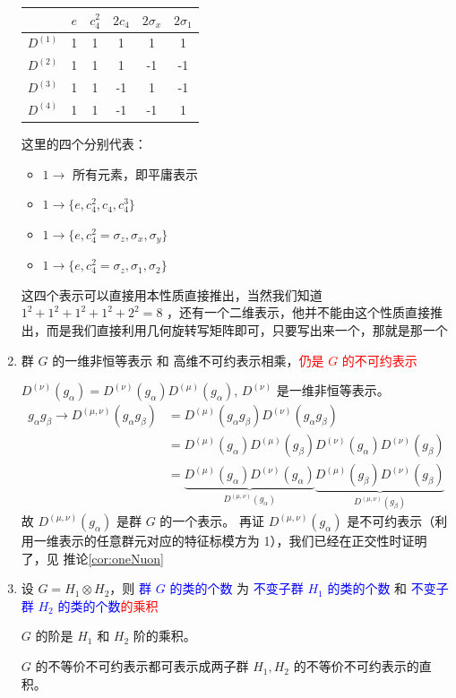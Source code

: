 \begin{enumerate}
    \begin{center}
        \begin{tabular}{c|ccccc}
             & $e$ & $c_4^{2}$ &  $2c_4$ & $2\sigma_{x}$ & $2\sigma_1$\\
            \hline
            $D^{(1)}$ & 1 & 1 & 1 & 1 & 1 \\
            $D^{(2)}$ & 1 & 1 & 1 & -1 & -1 \\
            $D^{(3)}$ & 1 & 1 & -1 & 1 & -1 \\
            $D^{(4)}$ & 1 & 1 & -1 & -1 & 1 \\

        \end{tabular}
        \end{center}
这里的四个分别代表：
\begin{itemize}
  \item ${1}\to $ 所有元素，即平庸表示
  \item ${1}\to \{e, c_4^2,c_4, c_4^3\} $
  \item ${1}\to \{e, c_4^2=\sigma_z, \sigma_x, \sigma_y\} $
  \item ${1}\to \{e, c_4^2=\sigma_z, \sigma_1, \sigma_2\} $
\end{itemize}

这四个表示可以直接用本性质直接推出，当然我们知道 $1^{2}+1^{2}+1^{2}+1^{2}+2^{2}=8$  ，还有一个二维表示，他并不能由这个性质直接推出，而是我们直接利用几何旋转写矩阵即可，只要写出来一个，那就是那一个

\item 群 $G$ 的一维非恒等表示 和 高维不可约表示相乘，\textcolor{red}{仍是 $G$ 的不可约表示}

$D^{(\nu)}(g_\alpha) = D^{(\nu)}(g_\alpha) D^{(\mu)}(g_\alpha)$, $D^{(\nu)}$ 是一维非恒等表示。
\begin{equation}
    \begin{aligned}
        g_\alpha g_\beta \to D^{(\mu,\nu)}(g_\alpha g_\beta) &= D^{(\mu)}(g_\alpha g_\beta) D^{(\nu)}(g_\alpha g_\beta) \\
        &= D^{(\mu)}(g_\alpha) D^{(\mu)}(g_\beta) D^{(\nu)}(g_\alpha) D^{(\nu)}(g_\beta) \\
        &= \underbrace{D^{(\mu)}(g_\alpha) D^{(\nu)}(g_\alpha)}_{D^{(\mu,\nu)}(g_\alpha)} \underbrace{D^{(\mu)}(g_\beta) D^{(\nu)}(g_\beta)}_{D^{(\mu,\nu)}(g_\beta)}
    \end{aligned}
\end{equation}
故 $D^{(\mu,\nu)}(g_\alpha)$ 是群 $G$ 的一个表示。
再证 $D^{(\mu,\nu)}(g_\alpha)$ 是不可约表示（利用一维表示的任意群元对应的特征标模方为 1），我们已经在正交性时证明了，见 推论\ref{cor:oneNuon}

\item 设 $G = H_1 \otimes H_2$，则 \textcolor{blue}{群 $G$ 的类的个数} 为 \textcolor{blue}{不变子群 $H_1$ 的类的个数} 和 \textcolor{blue}{不变子群 $H_2$ 的类的个数}\textcolor{red}{的乘积}

$G$ 的阶是 $H_1$ 和 $H_2$ 阶的乘积。

$G$ 的不等价不可约表示都可表示成两子群 $H_1, H_2$ 的不等价不可约表示的直积。

\end{enumerate}





